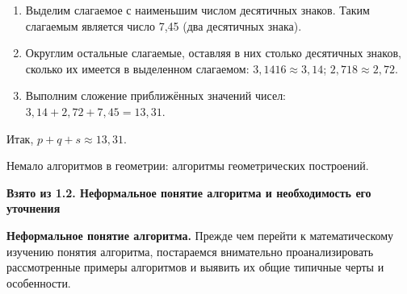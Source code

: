 \documentclass[a4paper,12pt]{article}
\begin{document}
\begin{enumerate}
    \item Выделим слагаемое с наименьшим числом десятичных знаков. Таким слагаемым является число 7,45 (два десятичных знака).
    \item Округлим остальные слагаемые, оставляя в них столько десятичных знаков, сколько их имеется в выделенном слагаемом: \(3,1416 \approx 3,14\); \(2,718 \approx 2,72\).
    \item Выполним сложение приближённых значений чисел: \(3,14 + 2,72 + 7,45 = 13,31\).
\end{enumerate}

Итак, \(p+q+s \approx 13,31\).

Немало алгоритмов в геометрии: алгоритмы геометрических построений.

\textbf{Взято из 1.2. Неформальное понятие алгоритма и необходимость его уточнения}

\textbf{Неформальное понятие алгоритма.} Прежде чем перейти к математическому изучению понятия алгоритма, постараемся внимательно проанализировать рассмотренные примеры алгоритмов и выявить их общие типичные черты и особенности.
\end{document}
